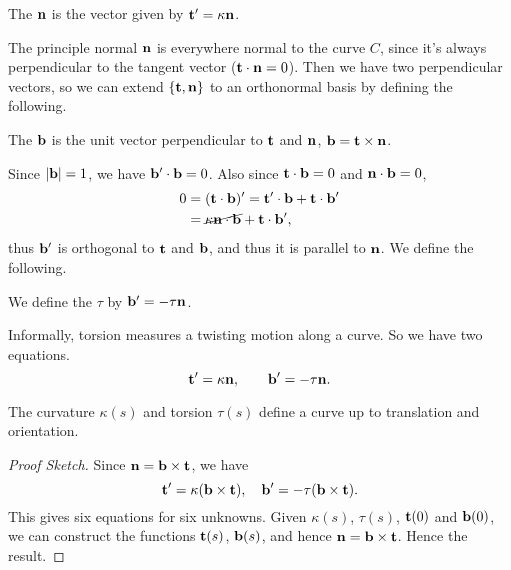 \documentclass[a4paper]{scrreprt}
\begin{document}
\begin{definition}
	The  $\mathbf{n}$ is the vector given by $\mathbf{t}' = \kappa \mathbf{n}$.
\end{definition}

The principle normal $\mathbf{n}$ is everywhere normal to the curve $C$, since it's always perpendicular to the tangent vector ($\mathbf{t} \cdot \mathbf{n} = 0$). Then we have two perpendicular vectors, so we can extend $\{\mathbf{t}, \mathbf{n}\}$ to an orthonormal basis by defining the following.

\begin{definition}[Binormal]
	The  $\mathbf{b}$ is the unit vector perpendicular to $\mathbf{t}$ and $\mathbf{n}$, $\mathbf{b} = \mathbf{t} \times \mathbf{n}$. 
\end{definition}

Since $|\mathbf{b}| = 1$, we have $\mathbf{b}' \cdot \mathbf{b} = 0$. Also since $\mathbf{t} \cdot \mathbf{b} = 0$ and $\mathbf{n} \cdot \mathbf{b} = 0$,
\begin{align*}
	0 &= (\mathbf{t} \cdot \mathbf{b})' = \mathbf{t}' \cdot \mathbf{b} + \mathbf{t} \cdot \mathbf{b}'  \\
	&= \cancel{\kappa \mathbf{n} \cdot \mathbf{b}} + \mathbf{t} \cdot \mathbf{b}',
\end{align*}
thus $\mathbf{b}'$ is orthogonal to $\mathbf{t}$ and $\mathbf{b}$, and thus it is parallel to $\mathbf{n}$. We define the following.

\begin{definition}[Torsion]
	We define the  $\tau$ by $\mathbf{b}' = - \tau \mathbf{n}$.
\end{definition}

Informally, torsion measures a twisting motion along a curve.
So we have two equations.
$$
\mathbf{t}' = \kappa \mathbf{n}, \quad \quad \mathbf{b}' = - \tau \mathbf{n}.
$$

\begin{proposition}
	The curvature $\kappa(s)$ and torsion $\tau(s)$ define a curve up to translation and orientation.
\end{proposition}
\begin{proof}[Proof Sketch]
	Since $\mathbf{n} = \mathbf{b} \times \mathbf{t}$, we have
	$$
	\mathbf{t}' = \kappa (\mathbf{b} \times \mathbf{t}), \quad \mathbf{b}' = - \tau (\mathbf{b} \times \mathbf{t}).
	$$
	This gives six equations for six unknowns. Given $\kappa(s)$, $\tau(s)$, $\mathbf{t}(0)$ and $\mathbf{b}(0)$, we can construct the functions $\mathbf{t}(s)$, $\mathbf{b}(s)$, and hence $\mathbf{n} = \mathbf{b} \times \mathbf{t}$. Hence the result.
\end{proof}
\end{document}
